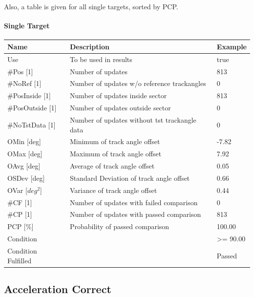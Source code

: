 Also, a table is given for all single targets, sorted by PCP.

\paragraph{Single Target}

\begin{center}
 \begin{table}[H]
  \begin{tabularx}{\textwidth}{ | l | X |  l | }
    \hline
    \textbf{Name} & \textbf{Description} & \textbf{Example} \\ \hline
    Use & To be used in results & true \\ \hline
    \#Pos [1] & Number of updates & 813 \\ \hline
    \#NoRef [1] & Number of updates w/o reference trackangles & 0 \\ \hline
    \#PosInside [1] & Number of updates inside sector & 813 \\ \hline
    \#PosOutside [1] & Number of updates outside sector & 0 \\ \hline
    \#NoTstData [1] & Number of updates without tst trackangle data & 0 \\ \hline
    OMin [deg] & Minimum of track angle offset & -7.82 \\ \hline
    OMax [deg] & Maximum of track angle offset & 7.92 \\ \hline
    OAvg [deg] & Average of track angle offset & 0.05 \\ \hline
    OSDev [deg] & Standard Deviation of track angle offset & 0.66 \\ \hline
    OVar [$deg^2$] & Variance of track angle offset & 0.44 \\ \hline
    \#CF [1] & Number of updates with failed comparison & 0 \\ \hline
    \#CP [1] & Number of updates with passed comparison & 813 \\ \hline
    PCP [\%] & Probability of passed comparison & 100.00 \\ \hline
    Condition &  & >= 90.00 \\ \hline
    Condition Fulfilled &  & Passed \\ \hline
\end{tabularx}
\end{table}
\end{center}


\subsection{Acceleration Correct}
\label{sec:eval_req_accel_correct} 

